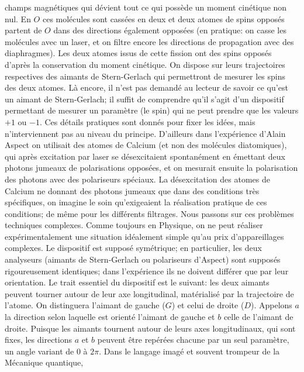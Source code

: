 champs magn\'etiques qui d\'evient tout ce qui poss\`ede un moment 
cin\'etique non nul. En $O$ ces mol\'ecules sont cass\'ees en deux et deux
atomes de  spins oppos\'es partent de $O$ dans des directions \'egalement
oppos\'ees (en pratique: on casse les mol\'ecules avec un laser, et on
filtre encore les directions de propagation avec des diaphragmes). Les
deux atomes issus de cette fission ont des spins oppos\'es d'apr\`es la
conservation du moment cin\'etique. On dispose sur leurs trajectoires 
respectives des aimants de Stern-Gerlach qui permettront de mesurer 
les spins des deux atomes. L\`a encore, il n'est pas demand\'e au lecteur 
de savoir ce qu'est un aimant de Stern-Gerlach; il suffit de comprendre 
qu'il s'agit d'un dispositif permettant de mesurer un param\`etre (le spin) 
qui ne peut prendre que les valeurs $+1$ ou $-1$. Ces d\'etails pratiques 
sont donn\'es pour fixer  les id\'ees, mais n'interviennent pas au niveau  
du principe. D'ailleurs dans l'exp\'erience d'Alain Aspect on utilisait des 
atomes de Calcium (et non  des mol\'ecules diatomiques), qui apr\`es
excitation par laser se d\'esexcitaient  spontan\'ement en \'emettant 
deux photons jumeaux de polarisations oppos\'ees, et on mesurait 
ensuite la polarisation des photons avec des polariseurs sp\'eciaux. La
d\'esexcitation des atomes de Calcium ne donnant des photons jumeaux 
que dans des conditions tr\`es sp\'ecifiques, on imagine  le soin
qu'exigeaient la r\'ealisation pratique de ces conditions; de m\^eme  pour
les diff\'erents filtrages. Nous passons  sur  ces probl\`emes techniques
complexes. Comme toujours en Physique, on  ne peut r\'ealiser
exp\'erimentalement une situation id\'ealement simple qu'au prix
d'appareillages complexes.  
\medskip  
Le dispositif est suppos\'e sym\'etrique; en particulier, les deux 
analyseurs (aimants de Stern-Gerlach ou polariseurs d'Aspect) sont 
suppos\'es rigoureusement identiques;
dans l'exp\'erience ils ne doivent diff\'erer que par leur orientation. 
\medskip 
Le trait essentiel du dispositif est le suivant: les deux aimants peuvent 
tourner autour de leur axe longitudinal, mat\'erialis\'e par la trajectoire 
de l'atome. On distinguera l'aimant de gauche ($G$) et celui de droite ($D$). 
Appelons  $a$ la direction selon laquelle est orient\'e l'aimant de gauche 
et $b$ celle de l'aimant de droite. Puisque les aimants tournent autour de 
leurs axes longitudinaux, qui sont fixes, les directions $a$ et $b$ peuvent  
\^etre rep\'er\'ees chacune par un seul param\`etre, un angle variant de  
$0$ \`a $2\pi$.  
\medskip 
Dans le langage imag\'e et souvent trompeur de la M\'ecanique quantique, 
